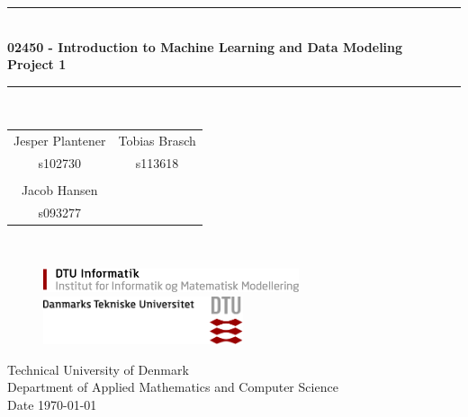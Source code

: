 \begin{titlepage}
\centering \parindent=0pt
\newcommand{\HRule}{\rule{\textwidth}{1mm}}
 \HRule\\[1cm]\Huge\bfseries
02450 - Introduction to Machine Learning and Data Modeling \\ [0.4cm] \Large Project 1\\ [0.7cm]
\HRule\\[2cm]
\large


\begin{tabular}{cc}
Jesper Plantener \qquad &  \qquad Tobias Brasch \\
s102730 & \qquad s113618 \\
\\
Jacob Hansen \\
s093277 \\
\end{tabular}\\[2cm]
 \normalsize

\begin{figure}[!h]
\centering
\includegraphics[height=20pt]{pictures/DTU-informatik.jpg}\hfill
\includegraphics[height=40pt]{pictures/DTU-logo-farve.png}
\end{figure}

\begin{flushleft}
Technical University of Denmark\\
Department of Applied Mathematics and Computer Science\\
Date \today \end{flushleft}
\end{titlepage}

